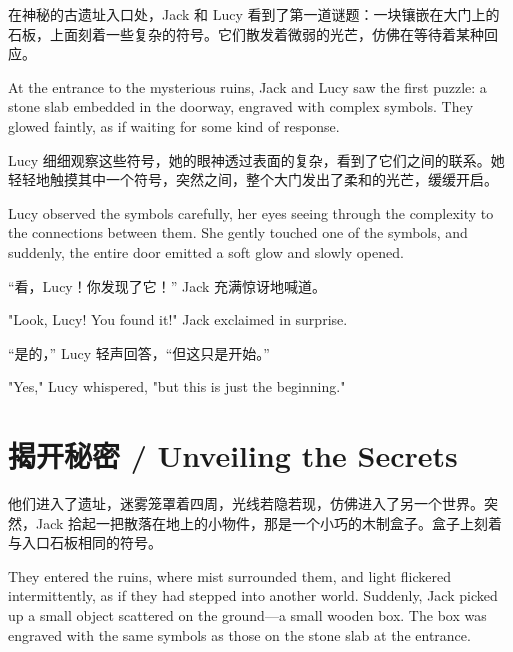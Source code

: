 在神秘的古遗址入口处，Jack 和 Lucy 看到了第一道谜题：一块镶嵌在大门上的石板，上面刻着一些复杂的符号。它们散发着微弱的光芒，仿佛在等待着某种回应。

\begin{flushright}
At the entrance to the mysterious ruins, Jack and Lucy saw the first puzzle: a stone slab embedded in the doorway, engraved with complex symbols. They glowed faintly, as if waiting for some kind of response.
\end{flushright}

Lucy 细细观察这些符号，她的眼神透过表面的复杂，看到了它们之间的联系。她轻轻地触摸其中一个符号，突然之间，整个大门发出了柔和的光芒，缓缓开启。

\begin{flushright}
Lucy observed the symbols carefully, her eyes seeing through the complexity to the connections between them. She gently touched one of the symbols, and suddenly, the entire door emitted a soft glow and slowly opened.
\end{flushright}

“看，Lucy！你发现了它！” Jack 充满惊讶地喊道。

\begin{flushright}
"Look, Lucy! You found it!" Jack exclaimed in surprise.
\end{flushright}

“是的，” Lucy 轻声回答，“但这只是开始。”

\begin{flushright}
"Yes," Lucy whispered, "but this is just the beginning."
\end{flushright}

\section*{揭开秘密 / Unveiling the Secrets}

他们进入了遗址，迷雾笼罩着四周，光线若隐若现，仿佛进入了另一个世界。突然，Jack 拾起一把散落在地上的小物件，那是一个小巧的木制盒子。盒子上刻着与入口石板相同的符号。

\begin{flushright}
They entered the ruins, where mist surrounded them, and light flickered intermittently, as if they had stepped into another world. Suddenly, Jack picked up a small object scattered on the ground—a small wooden box. The box was engraved with the same symbols as those on the stone slab at the entrance.
\end{flushright}

